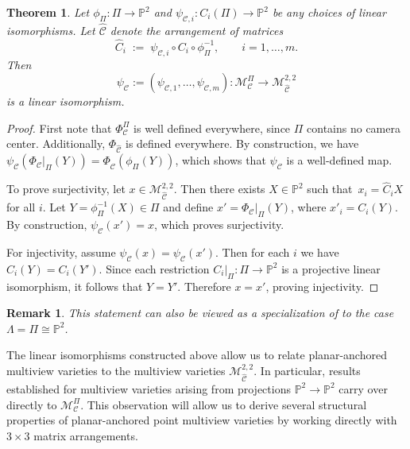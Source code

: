 \documentclass{article}
\newtheorem{theorem}{Theorem}
\newcommand{\PP}{\mathbb{P}}
\newtheorem{remark}{Remark}
\begin{document}
\begin{theorem}
Let $\phi_{\Pi}:\Pi \to \mathbb P^2$ and
$\psi_{\mathcal C,i}:C_i(\Pi)\to\mathbb P^2$
be any choices of linear isomorphisms.
Let $\widehat{\mathcal C}$ denote the arrangement of matrices
\[
\widehat C_i
\;:=\;
\psi_{\mathcal C,i}\circ C_i \circ \phi_{\Pi}^{-1},
\qquad i=1,\ldots,m.
\]
Then
\[
\psi_{\mathcal C}
:=
(\psi_{\mathcal C,1},\ldots,\psi_{\mathcal C,m})
:\mathcal{M}_\mathcal{C}^\Pi
\longrightarrow
\mathcal M^{2,2}_{\widehat{\mathcal C}}
\]
is a linear isomorphism.
\end{theorem}

\begin{proof}
First note that $\Phi_{\mathcal C}^{\Pi}$ is well defined everywhere, since
$\Pi$ contains no camera center. Additionally, $\Phi_{\widehat{\mathcal C}}$ is defined everywhere. By construction, we have~\(\psi_{\mathcal C}(\Phi_{\mathcal C}|_{\Pi}(Y))
=
\Phi_{\widehat{\mathcal C}}(\phi_\Pi(Y))\),
which shows that $\psi_{\mathcal C}$ is a well-defined map.

\medskip

To prove surjectivity, let $x\in\mathcal M^{2,2}_{\widehat{\mathcal C}}$.
Then there exists $X\in\mathbb P^2$ such that~\mbox{\(x_i=\widehat C_i X\)} for all $i$.
Let $Y=\phi_\Pi^{-1}(X)\in\Pi$ and define
\(x'=\Phi_{\mathcal C}|_{\Pi}(Y)\), where \(x'_i=C_i(Y)\).
By construction, \(\psi_{\mathcal C}(x')=x\), which proves surjectivity.

\medskip

For injectivity, assume
\(\psi_{\mathcal C}(x)=\psi_{\mathcal C}(x')\).
Then for each $i$ we have~\mbox{\(C_i(Y)=C_i(Y')\).}
Since each restriction \(C_i|_\Pi:\Pi\to\mathbb P^2\) is a projective linear
isomorphism, it follows that \(Y=Y'\).
Therefore \(x=x'\), proving injectivity.
\end{proof}

\begin{remark}
This statement can also be viewed as a specialization of
\cite[Lemma~2.1]{DuffRydell2024} to the case
$\Lambda=\Pi\cong\mathbb P^2$.
\end{remark}
The linear isomorphisms constructed above allow us to relate planar-anchored
multiview varieties to the multiview varieties $\mathcal M^{2,2}_{\widehat{\mathcal C}}$. In particular, results established for multiview varieties arising from projections $\PP^2 \to \PP^2$ carry over directly to
$\mathcal{M}_\mathcal{C}^\Pi$. This observation will allow us to derive several structural properties of planar-anchored point multiview varieties by working directly with $3\times3$ matrix arrangements.
\end{document}

